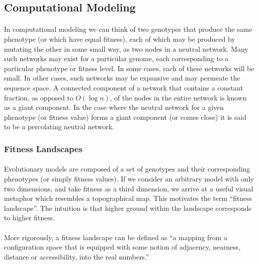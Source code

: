 \documentclass[12pt,letterpaper,titlepage]{article}
\begin{document}
\subsection{Computational Modeling}

\paragraph{}
In computational modeling we can think of two genotypes that produce the same
phenotype (or which have equal fitness), each of which may be produced by
mutating the other in some small way, as two nodes in a neutral network. Many
such networks may exist for a particular genome, each corresponding to a
particular phenotype or fitness level. In some cases, each of these networks
will be small. In other cases, such networks may be expansive and may permeate
the sequence space. A connected component of a network that contains a constant
fraction, as opposed to $O\left(\log n\right)$, of the nodes in the entire
network is known as a giant component. In the case where the neutral network
for a given phenotype (or fitness value) forms a giant component (or comes
close) it is said to be a percolating neutral network.

\subsubsection{Fitness Landscapes}

\paragraph{}
Evolutionary models are composed of a set of genotypes and their corresponding
phenotypes (or simply fitness values).  If we consider an arbitrary model with
only two dimensions, and take fitness as a third dimension, we arrive at a
useful visual metaphor which resembles a topographical map. This motivates the
term ``fitness landscape''. The intuition is that higher ground within the
landscape corresponds to higher fitness.

\paragraph{}
More rigorously, a fitness landscape can be defined as ``a mapping from a
configuration space that is equipped with some notion of adjacency, nearness,
distance or accessibility, into the real numbers.''~\cite{Calcott2008}
\end{document}
